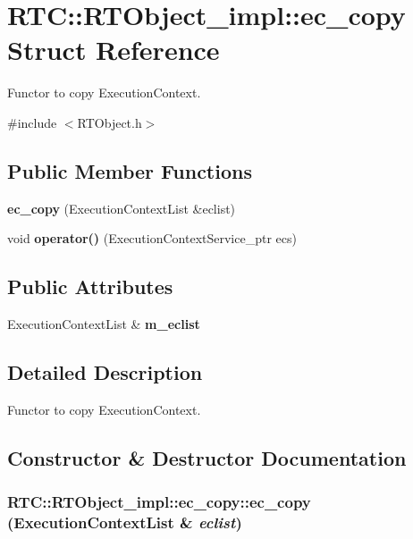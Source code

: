 \section{RTC::RTObject\_\-impl::ec\_\-copy Struct Reference}
\label{structRTC_1_1RTObject__impl_1_1ec__copy}


Functor to copy ExecutionContext.  




{\ttfamily \#include $<$RTObject.h$>$}

\subsection*{Public Member Functions}
\begin{DoxyCompactItemize}
\item 
{\bf ec\_\-copy} (ExecutionContextList \&eclist)
\item 
void {\bf operator()} (ExecutionContextService\_\-ptr ecs)
\end{DoxyCompactItemize}
\subsection*{Public Attributes}
\begin{DoxyCompactItemize}
\item 
ExecutionContextList \& {\bf m\_\-eclist}
\end{DoxyCompactItemize}


\subsection{Detailed Description}
Functor to copy ExecutionContext. 

\subsection{Constructor \& Destructor Documentation}
\subsubsection[{ec\_\-copy}]{\setlength{\rightskip}{0pt plus 5cm}RTC::RTObject\_\-impl::ec\_\-copy::ec\_\-copy (ExecutionContextList \& {\em eclist})\hspace{0.3cm}{\ttfamily  [inline]}}\label{structRTC_1_1RTObject__impl_1_1ec__copy_a673a474c9400970f721ae7829cdfca2d}



